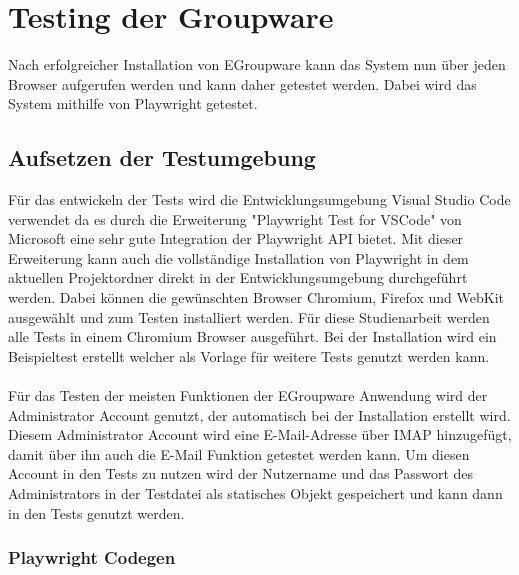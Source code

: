 \chapter{Testing der Groupware}

Nach erfolgreicher Installation von EGroupware kann das System nun über jeden Browser aufgerufen werden und kann daher getestet werden.
Dabei wird das System mithilfe von Playwright getestet.

\section{Aufsetzen der Testumgebung}

Für das entwickeln der Tests wird die Entwicklungsumgebung Visual Studio Code verwendet da es durch die Erweiterung "Playwright Test for VSCode" von Microsoft eine sehr gute Integration der Playwright API bietet.
Mit dieser Erweiterung kann auch die vollständige Installation von Playwright in dem aktuellen Projektordner direkt in der Entwicklungsumgebung durchgeführt werden.
Dabei können die gewünschten Browser Chromium, Firefox und WebKit ausgewählt und zum Testen installiert werden.
Für diese Studienarbeit werden alle Tests in einem Chromium Browser ausgeführt.
Bei der Installation wird ein Beispieltest erstellt welcher als Vorlage für weitere Tests genutzt werden kann.
\\
\\
Für das Testen der meisten Funktionen der EGroupware Anwendung wird der Administrator Account genutzt, der automatisch bei der Installation erstellt wird.
Diesem Administrator Account wird eine E-Mail-Adresse über IMAP hinzugefügt, damit über ihn auch die E-Mail Funktion getestet werden kann.
Um diesen Account in den Tests zu nutzen wird der Nutzername und das Passwort des Administrators in der Testdatei als statisches Objekt gespeichert und kann dann in den Tests genutzt werden.

\subsection*{Playwright Codegen}

